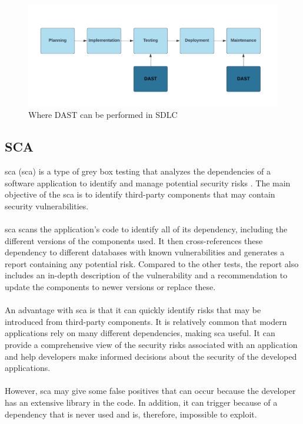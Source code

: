 \vspace{2mm}
\begin{figure}[H]
    \centering
    \includegraphics[width=0.8\columnwidth]{Images/dast.png}
    \caption{Where DAST can be performed in SDLC} 
    \label{fig: Where DAST can be performed in SDLC}
\end{figure}

\subsection{SCA}
\acrlong{sca} (\acrshort{sca}) is a type of grey box testing that analyzes the dependencies of a software application to identify and manage potential security risks \cite{sca}. The main objective of the \acrshort{sca} is to identify third-party components that may contain security vulnerabilities. 
\\~\\
\acrshort{sca} scans the application's code to identify all of its \gls{dependency}, including the different versions of the components used. It then cross-references these \gls{dependency} to different databases with known vulnerabilities and generates a report containing any potential risk. Compared to the other tests, the report also includes an in-depth description of the vulnerability and a recommendation to update the components to newer versions or replace these. 
\\~\\
An advantage with \acrshort{sca} is that it can quickly identify risks that may be introduced from third-party components. It is relatively common that modern applications rely on many different dependencies, making \acrshort{sca} useful. It can provide a comprehensive view of the security risks associated with an application and help developers make informed decisions about the security of the developed applications. 
\\~\\
However, \acrshort{sca} may give some false positives that can occur because the developer has an extensive library in the code. In addition, it can trigger because of a dependency that is never used and is, therefore, impossible to exploit.
